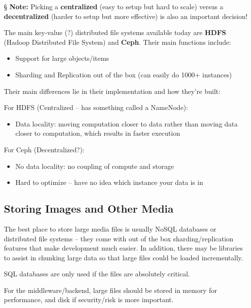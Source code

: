 \documentclass{report}
\newcommand{\npar}{\par\noindent}
\newcommand{\vpar}{\vspace{1em}\npar}
\newcommand{\nnote}{\npar \S \textbf{ Note: }}
\begin{document}
\nnote Picking a \textbf{centralized} (easy to setup but hard to scale) versus a \textbf{decentralized} (harder to setup but more effective) is also an important decision!

\vpar The main key-value (?) distributed file systems available today are \textbf{HDFS} (Hadoop Distributed File System) and \textbf{Ceph}. Their main functions include:

\begin{itemize}
    \item Support for large objects/items
    \item Sharding and Replication out of the box (can easily do 1000+ instances)
\end{itemize}

\npar Their main differences lie in their implementation and how they're built:

\vpar For HDFS (Centralized -- has something called a NameNode):

\begin{itemize}
    \item Data locality: moving computation closer to data rather than moving data closer to computation, which results in faster execution
\end{itemize}

\npar For Ceph (Decentralized?):

\begin{itemize}
    \item No data locality: no coupling of compute and storage
    \item Hard to optimize -- have no idea which instance your data is in
\end{itemize}

\newpage
\subsection{Storing Images and Other Media}

\par The best place to store large media files is usually NoSQL databases or distributed file systems -- they come with out of the box sharding/replication features that make development much easier. In addition, there may be libraries to assist in chunking large data so that large files could be loaded incrementally.

\vpar SQL databases are only used if the files are absolutely critical.

\vpar For the middleware/backend, large files should be stored in memory for performance, and disk if security/risk is more important.
\end{document}
